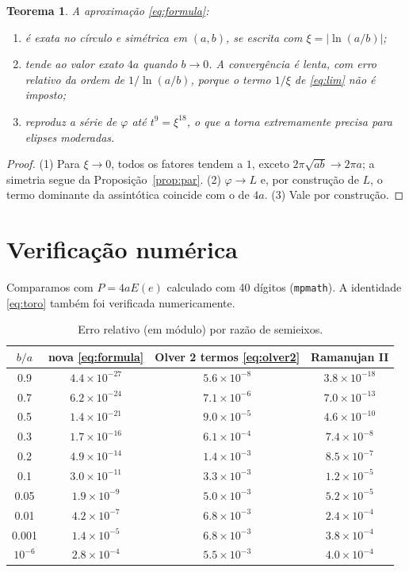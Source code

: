 \documentclass[11pt,a4paper]{article}
\newtheorem{teorema}{Teorema}
\theoremstyle{remark}
\begin{document}
\begin{teorema}
A aproximação \eqref{eq:formula}:
\begin{enumerate}
\item é exata no círculo e simétrica em $(a,b)$, se escrita com $\xi=|\ln(a/b)|$;
\item tende ao valor exato $4a$ quando $b\to0$. A convergência é lenta, com erro relativo
  da ordem de $1/\ln(a/b)$, porque o termo $1/\xi$ de \eqref{eq:lim} não é imposto;
\item reproduz a série de $\varphi$ até $t^9=\xi^{18}$, o que a torna extremamente precisa
  para elipses moderadas.
\end{enumerate}
\end{teorema}
\begin{proof}
(1) Para $\xi\to0$, todos os fatores tendem a $1$, exceto $2\pi\sqrt{ab}\to2\pi a$; a
simetria segue da Proposição~\ref{prop:par}.
(2) $\varphi\to L$ e, por construção de $L$, o termo dominante da assintótica coincide
com o de $4a$.
(3) Vale por construção.
\end{proof}

\section{Verificação numérica}

Comparamos com $P=4aE(e)$ calculado com 40 dígitos (\texttt{mpmath}). A identidade
\eqref{eq:toro} também foi verificada numericamente.

\begin{table}[H]
\centering
\begin{tabular}{cccc}
\toprule
$b/a$ & nova \eqref{eq:formula} & Olver 2 termos \eqref{eq:olver2} & Ramanujan II\\
\midrule
0.9  & $4.4\times10^{-27}$ & $5.6\times10^{-8}$ & $3.8\times10^{-18}$\\
0.7  & $6.2\times10^{-24}$ & $7.1\times10^{-6}$ & $7.0\times10^{-13}$\\
0.5  & $1.4\times10^{-21}$ & $9.0\times10^{-5}$ & $4.6\times10^{-10}$\\
0.3  & $1.7\times10^{-16}$ & $6.1\times10^{-4}$ & $7.4\times10^{-8}$\\
0.2  & $4.9\times10^{-14}$ & $1.4\times10^{-3}$ & $8.5\times10^{-7}$\\
0.1  & $3.0\times10^{-11}$ & $3.3\times10^{-3}$ & $1.2\times10^{-5}$\\
0.05 & $1.9\times10^{-9}$  & $5.0\times10^{-3}$ & $5.2\times10^{-5}$\\
0.01 & $4.2\times10^{-7}$  & $6.8\times10^{-3}$ & $2.4\times10^{-4}$\\
0.001& $1.4\times10^{-5}$  & $6.8\times10^{-3}$ & $3.8\times10^{-4}$\\
$10^{-6}$ & $2.8\times10^{-4}$ & $5.5\times10^{-3}$ & $4.0\times10^{-4}$\\
\bottomrule
\end{tabular}
\caption{Erro relativo (em módulo) por razão de semieixos.}
\end{table}
\end{document}
